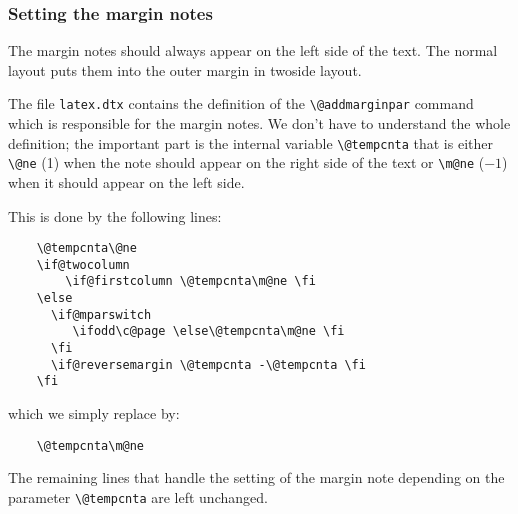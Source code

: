 \documentclass[twoside,a4paper]{refart}
\begin{document}
\vspace{0pt plus 1cm}

\subsubsection{Setting the margin notes}

The margin notes should always appear on the left side of the text. 
The normal layout puts them into the outer margin in twoside layout.

The file \texttt{latex.dtx} contains the definition of the 
\verb|\@addmarginpar| command which is responsible for the margin 
notes. We don't have to understand the whole definition; the important 
part is the internal variable \verb|\@tempcnta| that is either 
\verb|\@ne| (1) when the note should appear on the right side of the 
text or \verb|\m@ne| ($-1$) when it should appear on the left side.

This is done by the following lines:
\begin{verbatim}
    \@tempcnta\@ne
    \if@twocolumn
        \if@firstcolumn \@tempcnta\m@ne \fi
    \else
      \if@mparswitch
         \ifodd\c@page \else\@tempcnta\m@ne \fi
      \fi
      \if@reversemargin \@tempcnta -\@tempcnta \fi
    \fi
\end{verbatim}

which we simply replace by:
\begin{verbatim}
    \@tempcnta\m@ne
\end{verbatim}

The remaining lines that handle the setting of the margin note 
depending on the parameter \verb|\@tempcnta| are left unchanged.

\printindex
\end{document}
